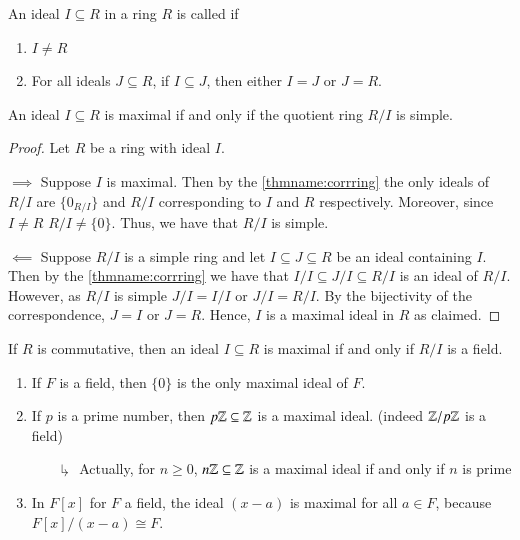 \documentclass[12pt, a4paper, oneside, openright, titlepage]{book}
\begin{document}
\begin{defn}
    An ideal $I \subseteq R$ in a ring $R$ is called  if \begin{enumerate}
        \item $I \neq R$
        \item For all ideals $J \subseteq R$, if $I \subseteq J$, then either $I = J$ or $J = R$.
    \end{enumerate}
\end{defn}

\begin{prop}
    An ideal $I \subseteq R$ is maximal if and only if the quotient ring $R/I$ is simple.
    \begin{proof}
        Let $R$ be a ring with ideal $I$. 
        
        $\implies$ Suppose $I$ is maximal. Then by the \ref{thmname:corrring} the only ideals of $R/I$ are $\{0_{R/I}\}$ and $R/I$ corresponding to $I$ and $R$ respectively. Moreover, since $I \neq R$ $R/I \neq \{0\}$. Thus, we have that $R/I$ is simple.
        
        $\impliedby$ Suppose $R/I$ is a simple ring and let $I \subseteq J \subseteq R$ be an ideal containing $I$. Then by the \ref{thmname:corrring} we have that $I/I \subseteq J/I \subseteq R/I$ is an ideal of $R/I$. However, as $R/I$ is simple $J/I = I/I$ or $J/I = R/I$. By the bijectivity of the correspondence, $J = I$ or $J = R$. Hence, $I$ is a maximal ideal in $R$ as claimed.
    \end{proof}
\end{prop}

\begin{cor}
    If $R$ is commutative, then an ideal $I \subseteq R$ is maximal if and only if $R/I$ is a field.
\end{cor}

\begin{eg}
    \leavevmode
    \begin{enumerate}
        \item If $F$ is a field, then $\{0\}$ is the only maximal ideal of $F$.
        \item If $p$ is a prime number, then $p\mathbb Z \subseteq \mathbb Z$ is a maximal ideal. (indeed $\mathbb Z/p\mathbb Z$ is a field)
        \begin{enumerate}
            \item[$\drsh$] Actually, for $n \geq 0$, $n\mathbb Z \subseteq \mathbb Z$ is a maximal ideal if and only if $n$ is prime
        \end{enumerate}
        \item In $F[x]$ for $F$ a field, the ideal $(x-a)$ is maximal for all $a \in F$, because $F[x]/(x-a) \cong F$.
    \end{enumerate}
\end{eg}
\end{document}
